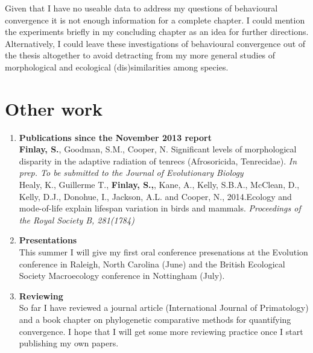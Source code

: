 \documentclass[12pt,a4paper]{article}
\begin{document}
Given that I have no useable data to address my questions of behavioural convergence it is not enough information for a complete chapter. I could mention the experiments briefly in my concluding chapter as an idea for further directions. Alternatively, I could leave these investigations of behavioural convergence out of the thesis altogether to avoid detracting from my more general studies of morphological and ecological (dis)similarities among species.

\section{Other work}
\begin{enumerate}

\item \textbf{Publications since the November 2013 report}\\
\textbf{Finlay, S.}, Goodman, S.M., Cooper, N. Significant levels of morphological disparity in the adaptive radiation of tenrecs (Afrosoricida, Tenrecidae). \textit{In prep. To be submitted to the Journal of Evolutionary Biology}\\
\bigskip %
Healy, K., Guillerme T., \textbf{Finlay, S.,}, Kane, A., Kelly, S.B.A., McClean, D., Kelly, D.J., Donohue, I., Jackson, A.L. and Cooper, N., 2014.Ecology and mode-of-life explain lifespan variation in birds and mammals. \textit{Proceedings of the Royal Society B, 281(1784)} 

\item \textbf{Presentations}\\
This summer I will give my first oral conference presenations at the Evolution conference in Raleigh, North Carolina (June) and the British Ecological Society Macroecology conference in Nottingham (July).

\item \textbf{Reviewing}\\

So far I have reviewed a journal article (International Journal of Primatology) and a book chapter on phylogenetic comparative methods for quantifying convergence. I hope that I will get some more reviewing practice once I start publishing my own papers.

\end{enumerate}
\end{document}

